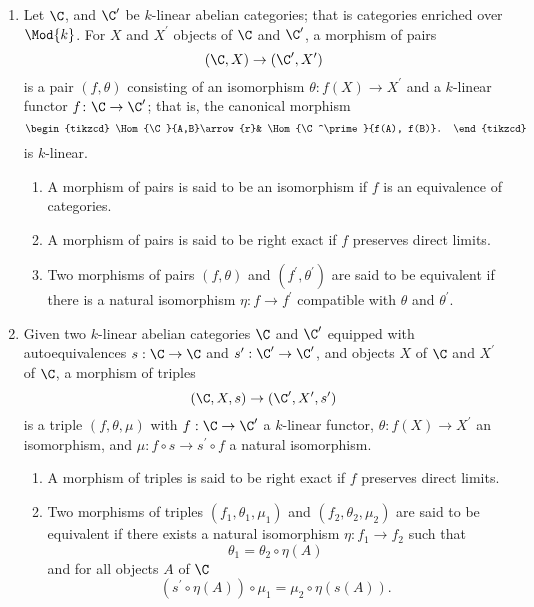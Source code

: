 \begin{defn}
  \begin{enumerate}
  \item
    Let $\C$, and $\C^\prime$ be $k$-linear abelian categories; that is categories enriched over $\Mod{k}$.
    For $X$ and $X^\prime$ objects of $\C$ and $\C^\prime$, a morphism of pairs
    $$(\C, X) \rightarrow (\C^\prime, X^\prime)$$
    is a pair $(f, \theta)$ consisting of an isomorphism $\theta \colon f(X) \rightarrow X^\prime$ and a $k$-linear functor $f \colon \C \rightarrow \C^\prime$; that is, the canonical morphism
    $$\begin{tikzcd}
      \Hom{\C}{A,B}\arrow{r}& \Hom{\C^\prime}{f(A), f(B)}.
    \end{tikzcd}$$
    is $k$-linear.
    \begin{enumerate}
    \item
      A morphism of pairs is said to be an isomorphism if $f$ is an equivalence of categories.
    \item
      A morphism of pairs is said to be right exact if $f$ preserves direct limits.
    \item
      Two morphisms of pairs $(f,\theta)$ and $(f^\prime, \theta^\prime)$ are said to be equivalent if there is a natural isomorphism $\eta \colon f \rightarrow f^\prime$ compatible with $\theta$ and $\theta^\prime$.
    \end{enumerate}
  \item
    Given two $k$-linear abelian categories $\C$ and $\C^\prime$ equipped with autoequivalences $s : \C \rightarrow \C$ and $s^\prime : \C^\prime \rightarrow \C^\prime$, and objects $X$ of $\C$ and $X^\prime$ of $\C$, a morphism of triples
    $$(\C, X, s) \rightarrow (\C^\prime, X^\prime, s^\prime)$$
    is a triple $(f, \theta, \mu)$ with $f : \C \rightarrow \C^\prime$ a $k$-linear functor, $\theta : f(X) \rightarrow X^\prime$ an isomorphism, and $\mu : f \circ s \rightarrow s^\prime \circ f$ a natural isomorphism.
    \begin{enumerate}
    \item
      A morphism of triples is said to be right exact if $f$ preserves direct limits.
    \item
      Two morphisms of triples $(f_1, \theta_1, \mu_1)$ and $(f_2, \theta_2, \mu_2)$ are said to be equivalent if there exists a natural isomorphism $\eta : f_1 \rightarrow f_2$ such that
      $$\theta_1 = \theta_2 \circ \eta(A)$$
      and for all objects $A$ of $\C$
      $$(s^\prime \circ \eta(A)) \circ \mu_1 = \mu_2 \circ \eta(s(A)).$$

\end{enumerate}
\end{enumerate}
\end{defn}
